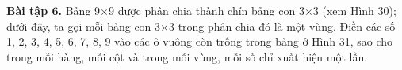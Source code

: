 	\textbf{Bài tập $\pmb{6}$.} Bảng 9$\times$9 được phân chia thành chín bảng con 3$\times$3 (xem Hình 30); dưới đây, ta gọi mỗi bảng con 3$\times$3 trong phân chia đó là  một vùng.
	\vskip 0.1cm
	Điền các số 1, 2, 3, 4, 5, 6, 7, 8, 9 vào các ô vuông còn trống trong bảng ở Hình 31, sao cho trong mỗi hàng, mỗi cột và trong mỗi vùng, mỗi số chỉ xuất hiện một lần.
